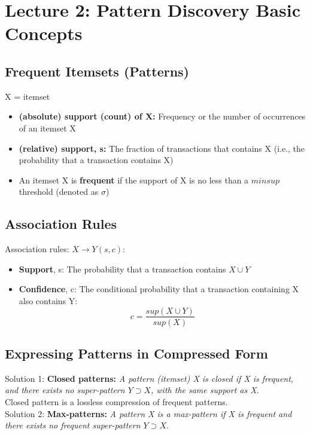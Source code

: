 \section{Lecture 2: Pattern Discovery Basic Concepts}
\subsection{Frequent Itemsets (Patterns)}

X = itemset

\begin{itemize}
\item \textbf{(absolute) support (count) of X:} Frequency or the number of occurrences of an itemset X
\item \textbf{(relative) support, s:} The fraction of transactions that contains X (i.e., the probability that a transaction contains X)
\item An itemset X is \textbf{frequent} if the support of X is no less than a $minsup$ threshold (denoted as $\sigma$)
\end{itemize}

\subsection{Association Rules}
Association rules: $X \to Y (s, c)$:
\begin{itemize}
\item \textbf{Support}, s: The probability that a transaction contains $X \cup Y$
\item \textbf{Confidence}, c: The conditional probability that a transaction containing X also contains Y: 
\begin{equation*}
c = \frac{sup(X \cup Y)}{sup(X)}
\end{equation*}
\end{itemize}

\subsection{Expressing Patterns in Compressed Form}
Solution 1: \textbf{Closed patterns:} \textit{A pattern (itemset) X is closed if X is frequent, and there exists no super-pattern $Y \supset X$, with the same support as X}.\\
    
Closed pattern is a lossless compression of frequent patterns.\\

Solution 2: \textbf{Max-patterns:} \textit{A pattern X is a max-pattern if X is frequent and there exists no frequent super-pattern $Y \supset X$}.\\


